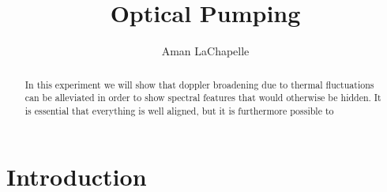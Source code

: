 \documentclass{article}
\title{Optical Pumping}
\author{Aman LaChapelle}
\begin{document}
\raggedright
\maketitle

\begin{abstract}
  In this experiment we will show that doppler broadening due to thermal fluctuations can be alleviated in order to show spectral features that would otherwise be hidden.  It is essential that everything is well aligned, but it is furthermore possible to 
\end{abstract}

\tableofcontents
\newpage

\section{Introduction}
\end{document}
